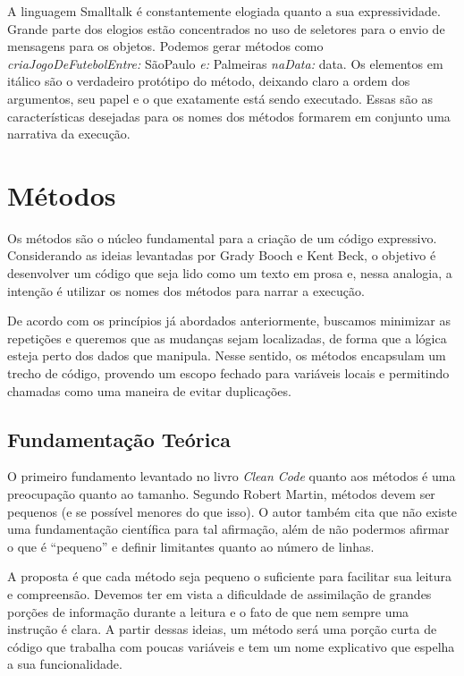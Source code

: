 A linguagem Smalltalk é constantemente elogiada quanto a sua expressividade. Grande parte dos elogios estão concentrados no uso de seletores para o envio de mensagens para os objetos. Podemos gerar métodos como \textit{criaJogoDeFutebolEntre:} SãoPaulo \textit{e:} Palmeiras \textit{naData:} data. Os elementos em itálico são o verdadeiro protótipo do método, deixando claro a ordem dos argumentos, seu papel e o que exatamente está sendo executado. Essas são as características desejadas para os nomes dos métodos formarem em conjunto uma narrativa da execução.

\section{Métodos}
\label{sec:metodos}

Os métodos são o núcleo fundamental para a criação de um código expressivo. Considerando as ideias levantadas por Grady Booch e Kent Beck, o objetivo é desenvolver um código que seja lido como um texto em prosa e, nessa analogia, a intenção é utilizar os nomes dos métodos para narrar a execução.
	
De acordo com os princípios já abordados anteriormente, buscamos minimizar as repetições e queremos que as mudanças sejam localizadas, de forma que a lógica esteja perto dos dados que manipula. Nesse sentido, os métodos encapsulam um trecho de código, provendo um escopo fechado para variáveis locais e permitindo chamadas como uma maneira de evitar duplicações.

\subsection{Fundamentação Teórica}
O primeiro fundamento levantado no livro \textit{Clean Code} quanto aos métodos é uma preocupação quanto ao tamanho. Segundo Robert Martin, métodos devem ser pequenos (e se possível menores do que isso). O autor também cita que não existe uma fundamentação científica para tal afirmação, além de não podermos afirmar o que é “pequeno” e definir limitantes quanto ao número de linhas.
	
A proposta é que cada método seja pequeno o suficiente para facilitar sua leitura e compreensão. Devemos ter em vista a dificuldade de assimilação de grandes porções de informação durante a leitura e o fato de que nem sempre uma instrução é clara. A partir dessas ideias, um método será uma porção curta de código que trabalha com poucas variáveis e tem um nome explicativo que espelha a sua funcionalidade.
	
